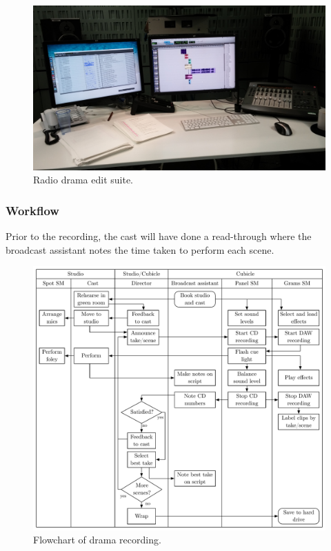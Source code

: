 \begin{figure}[ht]
  \centering
  \includegraphics[width=\columnwidth]{figs/drama-edit.jpg}
  \caption{Radio drama edit suite.}
  \label{fig:drama-edit}
\end{figure}

\subsubsection{Workflow}
Prior to the recording, the cast will have done a read-through where the broadcast assistant notes the time taken to
perform each scene.

\begin{figure}[ht]
  \centering
  \includegraphics[width=5in]{figs/drama-recording-workflow.pdf}
  \caption{Flowchart of drama recording.}
  \label{fig:ethno-drama-recording}
\end{figure}


